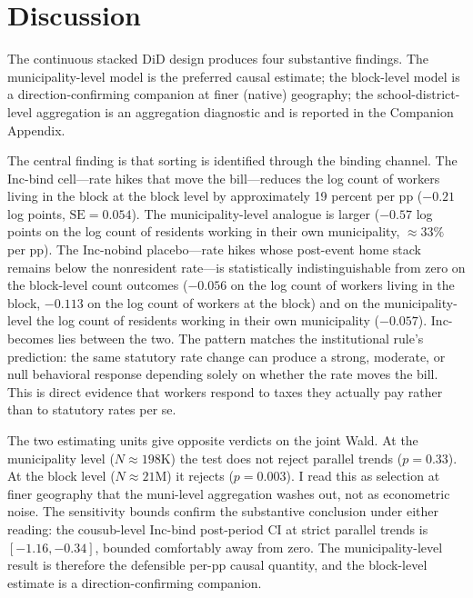 \documentclass[12pt]{article}
\begin{document}
\section{Discussion}
\label{sec:discussion}

The continuous stacked DiD design produces four substantive
findings. The municipality-level model is the preferred causal estimate;
the block-level model is a direction-confirming companion at finer
(native) geography; the school-district-level aggregation is an
aggregation diagnostic and is reported in the Companion Appendix.

The central finding is that sorting is identified through the binding channel.
The Inc-bind cell---rate hikes that move the bill---reduces
the log count of workers living in the block at the block level by approximately 19
percent per pp ($-0.21$ log points, $\text{SE} = 0.054$). The
municipality-level analogue is larger ($-0.57$ log points on
the log count of residents working in their own municipality, $\approx 33\%$ per pp). The Inc-nobind
placebo---rate hikes whose post-event home stack remains below the
nonresident rate---is statistically indistinguishable from zero on the
block-level count outcomes ($-0.056$ on the log count of workers living in the block,
$-0.113$ on the log count of workers at the block) and on the municipality-level
the log count of residents working in their own municipality ($-0.057$). Inc-becomes lies between the
two. The pattern matches the institutional rule's prediction: the
same statutory rate change can produce a strong, moderate, or null
behavioral response depending solely on whether the rate moves the
bill. This is direct evidence that workers respond to taxes they
actually pay rather than to statutory rates per se.

The two estimating units give opposite verdicts on the joint Wald.
At the municipality level ($N\approx 198\text{K}$) the test does
not reject parallel trends ($p=0.33$). At the block level
($N\approx 21$M) it rejects ($p=0.003$). I read this as selection
at finer geography that the muni-level aggregation washes out, not
as econometric noise. The
\citet{rambachanMoreCredibleApproach2023} sensitivity bounds
confirm the substantive conclusion under either reading: the
cousub-level Inc-bind post-period CI at strict parallel trends is
$[-1.16,-0.34]$, bounded comfortably away from zero. The
municipality-level result is therefore the defensible per-pp causal
quantity, and the block-level estimate is a direction-confirming
companion.
\end{document}
